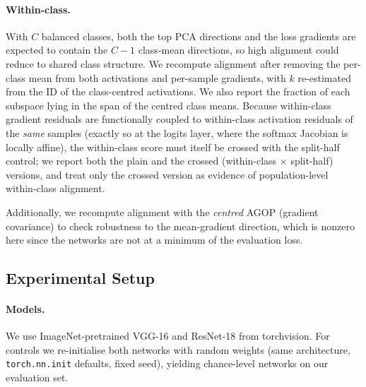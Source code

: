 \documentclass{article}
\begin{document}
\paragraph{Within-class.}  With $C$ balanced classes, both the top PCA
directions and the loss gradients are expected to contain the $C-1$
class-mean directions, so high alignment could reduce to shared class
structure.  We recompute alignment after removing the per-class mean from
both activations and per-sample gradients, with $k$ re-estimated from the ID
of the class-centred activations.  We also report the fraction of each
subspace lying in the span of the centred class means.  Because within-class
gradient residuals are functionally coupled to within-class activation
residuals of the \emph{same} samples (exactly so at the logits layer, where
the softmax Jacobian is locally affine), the within-class score must itself
be crossed with the split-half control; we report both the plain and the
crossed (within-class $\times$ split-half) versions, and treat only the
crossed version as evidence of population-level within-class alignment.

Additionally, we recompute alignment with the \emph{centred} AGOP (gradient
covariance) to check robustness to the mean-gradient direction, which is
nonzero here since the networks are not at a minimum of the evaluation loss.

\subsection{Experimental Setup}

\paragraph{Models.} We use ImageNet-pretrained VGG-16 \citep{simonyan2015vgg}
and ResNet-18 \citep{he2016resnet} from torchvision.  For controls we
re-initialise both networks with random weights (same architecture,
\texttt{torch.nn.init} defaults, fixed seed), yielding chance-level networks
on our evaluation set.
\end{document}
